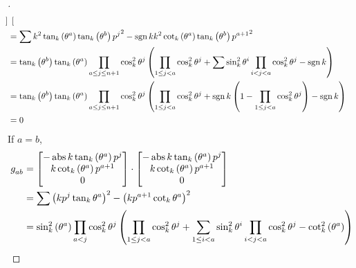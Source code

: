 \documentclass[stu, babel, american, biblatex, a4paper, leqno, draftall]{apa7}
\begin{document}
\begin{proof}[]
\begin{align*}
\begin{bmatrix}
        \end{bmatrix}                                                  \\
         & =
        \sum{k^2\tan_k\left(\tensor{\theta}{^a}\right)\tan_k\left(\tensor{\theta}{^b}\right){\tensor{p}{^j}}^2}
        -\sign{k}k^2\cot_k\left(\tensor{\theta}{^a}\right)\tan_k\left(\tensor{\theta}{^b}\right){\tensor{p}{^{a+1}}}^2 \\
         & =
        \tan_k\left(\tensor{\theta}{^b}\right)
        \tan_k\left(\tensor{\theta}{^a}\right)
        \prod_{a\le j\le n+1}{\cos_k^2\tensor{\theta}{^j}}
        \left(
        \prod_{1\le j<a}{\cos_k^2\tensor{\theta}{^j}}
        + \sum{
            \sin_k^2{\tensor{\theta}{^{i}}}\prod_{i<j<a}{\cos_k^2\tensor{\theta}{^j}}
        }
        -\sign{k}
        \right)                                                                                                        \\
         & =
        \tan_k\left(\tensor{\theta}{^b}\right)
        \tan_k\left(\tensor{\theta}{^a}\right)
        \prod_{a\le j\le n+1}{\cos_k^2\tensor{\theta}{^j}}
        \left(
        \prod_{1\le j<a}{\cos_k^2\tensor{\theta}{^j}}
        + \sign{k}\left(
        1-\prod_{1\le j<a}{\cos_k^2\tensor{\theta}{^j}}
        \right)
        - \sign{k}
        \right)                                                                                                        \\
         & = 0
    \end{align*}
    If $a=b$,
    \begin{align*}
        \tensor{g}{_a_b}
         & =\begin{bmatrix}
            -\abs{k}\tan_k\left(\tensor{\theta}{^a}\right)\tensor{p}{^j} \\
            k\cot_k\left(\tensor{\theta}{^a}\right)\tensor{p}{^{a+1}}    \\
            0                                                            \\
        \end{bmatrix}\cdot\begin{bmatrix}
            -\abs{k}\tan_k\left(\tensor{\theta}{^a}\right)\tensor{p}{^j} \\
            k\cot_k\left(\tensor{\theta}{^a}\right)\tensor{p}{^{a+1}}    \\
            0                                                            \\
        \end{bmatrix} \\
         & =
        \sum{\left(k\tensor{p}{^j}\tan_k\tensor{\theta}{^a}\right)^2}
        -\left(k\tensor{p}{^{a+1}}\cot_k\tensor{\theta}{^a}\right)^2  \\
         & =
        \sin_k^2\left(\tensor{\theta}{^a}\right)
        \prod_{a<j}{\cos_k^2\tensor{\theta}{^j}}
        \left(
        \prod_{1\le j<a}{\cos_k^2\tensor{\theta}{^j}}
        + \sum_{1\le i<a}{
            \sin_k^2{\tensor{\theta}{^{i}}}\prod_{i<j<a}{\cos_k^2\tensor{\theta}{^j}}
        }
        -\cot_k^2\left(\tensor{\theta}{^a}\right)
        \right)
    \end{align*}
\end{proof}
\end{document}

